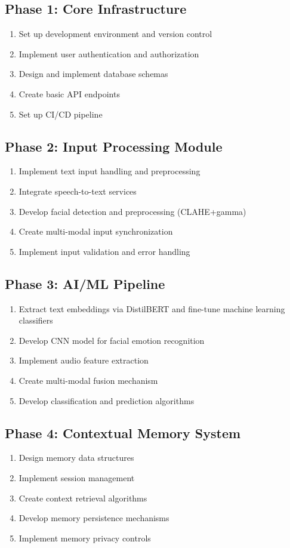 \documentclass[11pt]{report}
\begin{document}
\subsection{Phase 1: Core Infrastructure}
\begin{enumerate}
    \item Set up development environment and version control
    \item Implement user authentication and authorization
    \item Design and implement database schemas
    \item Create basic API endpoints
    \item Set up CI/CD pipeline
\end{enumerate}

\subsection{Phase 2: Input Processing Module}
\begin{enumerate}
    \item Implement text input handling and preprocessing
    \item Integrate speech-to-text services
    \item Develop facial detection and preprocessing (CLAHE+gamma)
    \item Create multi-modal input synchronization
    \item Implement input validation and error handling
\end{enumerate}

\subsection{Phase 3: AI/ML Pipeline}
\begin{enumerate}
    \item Extract text embeddings via DistilBERT and fine-tune machine learning classifiers
    \item Develop CNN model for facial emotion recognition
    \item Implement audio feature extraction
    \item Create multi-modal fusion mechanism
    \item Develop classification and prediction algorithms
\end{enumerate}

\subsection{Phase 4: Contextual Memory System}
\begin{enumerate}
    \item Design memory data structures
    \item Implement session management
    \item Create context retrieval algorithms
    \item Develop memory persistence mechanisms
    \item Implement memory privacy controls
\end{enumerate}
\end{document}
